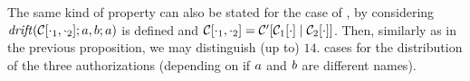\begin{proposition}{\label{prop:Cases_for_contexts}}
\end{proposition}

The same kind of property can also be stated for the case of , by considering $\mathit {drift}(\mathcal{C}[\cdot_1, \cdot_2];a,b;a)$ is defined and $\mathcal{C}[\cdot_1, \cdot_2]= \mathcal{C}'[\mathcal{C}_1[\cdot] \;|\; \mathcal{C}_2[\cdot]]$. Then, similarly as in the previous proposition, we may distinguish (up to) $14$. cases for the distribution of the three authorizations (depending on if $a$ and $b$ are different names). 

